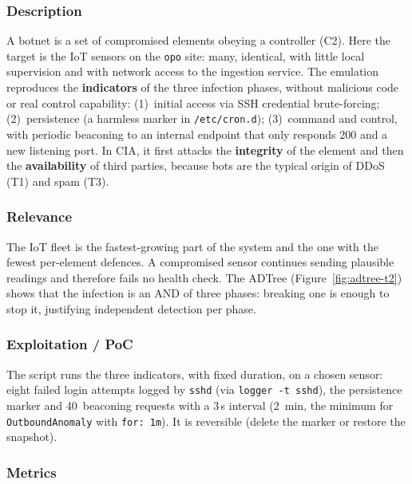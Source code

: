 \documentclass[11pt,a4paper]{article}
\begin{document}
\subsubsection{Description}

A botnet is a set of compromised elements obeying a controller (C2). Here the target is the
IoT sensors on the \texttt{opo} site: many, identical, with little local supervision and with
network access to the ingestion service. The emulation reproduces the \textbf{indicators} of
the three infection phases, without malicious code or real control capability:
(1)~initial access via SSH credential brute-forcing;
(2)~persistence (a harmless marker in \texttt{/etc/cron.d});
(3)~command and control, with periodic beaconing to an internal endpoint that only responds
200 and a new listening port.
In CIA, it first attacks the \textbf{integrity} of the element and then the
\textbf{availability} of third parties, because bots are the typical origin of DDoS (T1) and
spam (T3).

\subsubsection{Relevance}

The IoT fleet is the fastest-growing part of the system and the one with the fewest per-element
defences. A compromised sensor continues sending plausible readings and therefore fails no
health check. The ADTree (Figure~\ref{fig:adtree-t2}) shows that the infection is an AND of
three phases: breaking one is enough to stop it, justifying independent detection per phase.

\subsubsection{Exploitation / PoC}

The script runs the three indicators, with fixed duration, on a chosen sensor: eight failed
login attempts logged by \texttt{sshd} (via \texttt{logger~-t~sshd}), the persistence marker
and 40~beaconing requests with a 3\,s interval (2~min, the minimum for
\texttt{OutboundAnomaly} with \texttt{for:~1m}). It is reversible (delete the marker or
restore the snapshot).

\subsubsection{Metrics}
\end{document}
